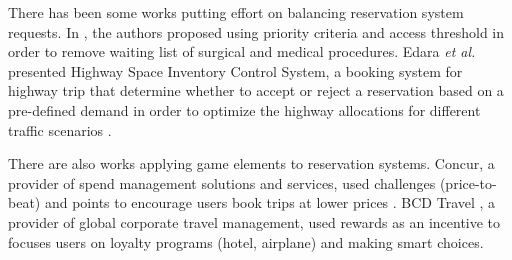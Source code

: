 
There has been some works putting effort on balancing reservation system requests. In \cite{gauld2000solving}, the authors proposed using priority criteria and access threshold in order to remove waiting list of surgical and medical procedures. Edara \emph{et al.} presented Highway Space Inventory Control System, a booking system for highway trip that determine whether to accept or reject a reservation based on a pre-defined demand in order to optimize the highway allocations for different traffic scenarios \cite{edara2008model}. 

There are also works applying game elements to reservation systems. Concur, a provider of spend management solutions and services, used challenges (price-to-beat) and points to encourage users book trips at lower prices \cite{concur}. BCD Travel \cite{bcd}, a provider of global corporate travel management, used rewards as an incentive to focuses users on loyalty programs (hotel, airplane) and making smart choices.



